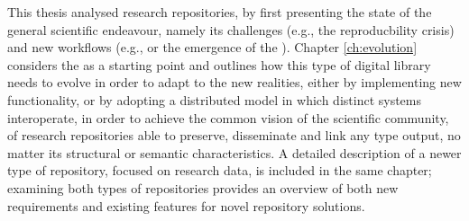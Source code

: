 This thesis analysed research repositories, by first presenting the state of the general scientific endeavour, namely its challenges (e.g., the reproducbility crisis) and new workflows (e.g.,  or the emergence of the ). Chapter \ref{ch:evolution} considers the  as a starting point and outlines how this type of digital library needs to evolve in order to adapt to the new realities, either by implementing new functionality, or by adopting a distributed model in which distinct systems interoperate, in order to achieve the common vision of the scientific community, of research repositories able to preserve, disseminate and link any type output, no matter its structural or semantic characteristics. A detailed description of a newer type of repository, focused on research data, is included in the same chapter; examining both types of repositories provides an overview of both new requirements and existing features for novel repository solutions.

